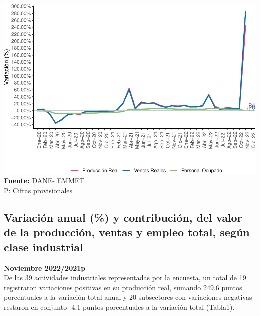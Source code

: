 \documentclass[
]{article}
\begin{document}
\includegraphics{boletin_files/figure-latex/historico-1.pdf}
\textbf{Fuente:} DANE- EMMET\\
P: Cifras provisionales\\

\hypertarget{variaciuxf3n-anual-y-contribuciuxf3n-del-valor-de-la-producciuxf3n-ventas-y-empleo-total-seguxfan-clase-industrial}{%
\subsection{Variación anual (\%) y contribución, del valor de la
producción, ventas y empleo total, según clase
industrial}\label{variaciuxf3n-anual-y-contribuciuxf3n-del-valor-de-la-producciuxf3n-ventas-y-empleo-total-seguxfan-clase-industrial}}

\textbf{Noviembre 2022/2021p}\\

De las 39 actividades industriales representadas por la encuesta, un
total de 19 registraron variaciones positivas en su producción real,
sumando 249.6 puntos porcentuales a la variación total anual y 20
subsectores con variaciones negativas restaron en conjunto -4.1 puntos
porcentuales a la variación total (Tabla1).
\end{document}
